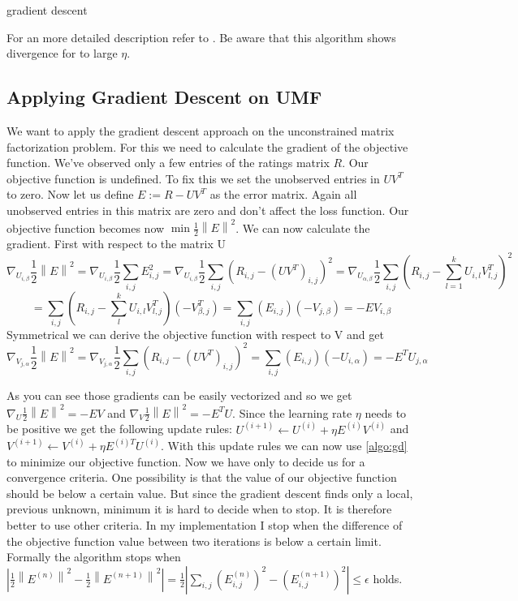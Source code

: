 \documentclass[DIV=12]{scrartcl}
\newcommand{\norm}[1]{\left\lVert#1\right\rVert}
\begin{document}
\begin{algorithm}[H]
	\caption{gradient descent}
	\label{algo:gd}

\end{algorithm}
For an more detailed description refer to \cite{ShSh14}.
Be aware that this algorithm shows divergence for to large $\eta$. 


\subsection{Applying Gradient Descent on UMF} 
We want to apply the gradient descent approach on the unconstrained matrix factorization problem. For this we need to calculate the gradient of the objective function. We've observed only a few entries of the ratings matrix $R$. Our objective function is undefined. To fix this we set the unobserved entries in $UV^T$ to zero. 
Now let us define $E:=R-UV^T$ as the error matrix. Again all unobserved entries in this matrix are zero and don't affect the loss function. Our objective function becomes now $\min\frac{1}{2}\norm{E}^2$.
We can now calculate the gradient.
First with respect to the matrix U
\[\nabla_{U_{i,\beta}} \frac{1}{2}\norm{E}^2 = \nabla_{U_{i,\beta}} \frac{1}{2}\sum_{i,j}E_{i,j}^2=\nabla_{U_{i,\beta}} \frac{1}{2}\sum_{i,j}(R_{i,j}-(UV^T)_{i,j})^2=
\nabla_{U_{\alpha,\beta}} \frac{1}{2}\sum_{i,j}(R_{i,j}-\sum_{l=1}^k U_{i,l}V^T_{l,j})^2\]
\[=\sum_{i,j}(R_{i,j}-\sum_{l}^k U_{i,l}V^T_{l,j})(-V^T_{\beta,j})=\sum_{i,j}(E_{i,j})(-V_{j,\beta})=-EV_{i,\beta} \]
Symmetrical we can derive the objective function with respect to V and get 
\[\nabla_{V_{j,\alpha}} \frac{1}{2}\norm{E}^2 = \nabla_{V_{j,\alpha}} \frac{1}{2}\sum_{i,j}(R_{i,j}-(UV^T)_{i,j})^2
=\sum_{i,j}(E_{i,j})(-U_{i,\alpha})=-E^TU_{j,\alpha} \]

As you can see those gradients can be easily vectorized and so we get $\nabla_U \frac{1}{2}\norm{E}^2=-EV$ and  $\nabla_V \frac{1}{2}\norm{E}^2=-E^TU$. Since the learning rate $\eta$ needs to be positive we get the following update rules: $U^{(i+1)} \leftarrow U^{(i)} + \eta E^{(i)}V^{(i)}$ and $V^{(i+1)} \leftarrow V^{(i)} + \eta E^{(i)T}U^{(i)}$. With this update rules we can now use \ref{algo:gd} to minimize our objective function. Now we have only to decide us for a convergence criteria. One possibility is that the value of our objective function should be below a certain value. But since the gradient descent finds only a local, previous unknown, minimum it is hard to decide when to stop. It is therefore better to use other criteria. In my implementation I stop when the difference of the objective function value between two iterations is below a certain limit. Formally the algorithm stops when $|\frac{1}{2}\norm{E^{(n)}}^2-\frac{1}{2}\norm{E^{(n+1)}}^2|=\frac{1}{2}|\sum_{i,j}(E_{i,j}^{(n)})^2-(E_{i,j}^{(n+1)})^2|\leq\epsilon$ holds.
\end{document}
